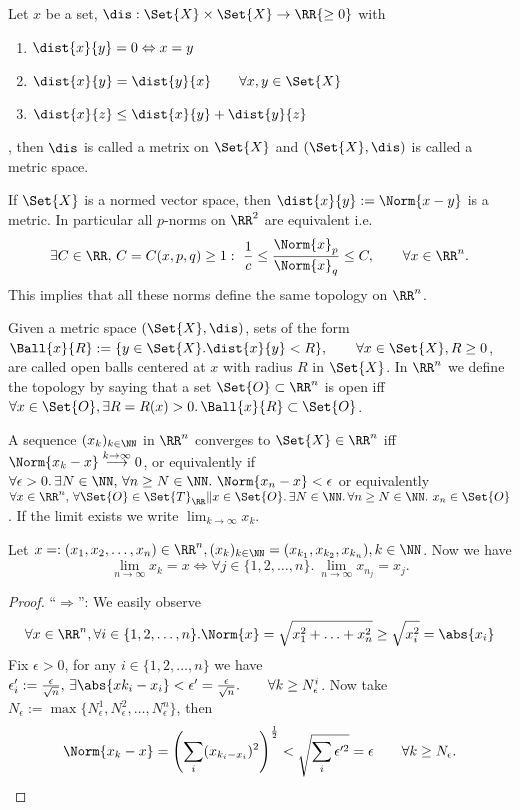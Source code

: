 \begin{defn}
 Let $x$ be a set, $\dis:\Set{X}\times\Set{X}\to\RR{\geq 0}$ with 
 \begin{enumerate}
  \item $\dist{x}{y}=0\Leftrightarrow x=y$
  \item $\dist{x}{y}=\dist{y}{x}\qquad\forall x,y\in\Set{X}$
  \item $\dist{x}{z}\leq \dist{x}{y}+\dist{y}{z}$
 \end{enumerate}, then $\dis$ is called a metrix on $\Set{X}$ and $(\Set{X}, \dis)$ is called a metric space. 
\end{defn}
\begin{exc}
 If $\Set{X}$ is a normed vector space, then $\dist{x}{y}:=\Norm{x-y}$ is a metric. 
 In particular all $p$-norms on $\RR^2$ are equivalent i.e.
 $$\exists C\in\RR,\,C=C(x,p,q)\geq 1:\ \frac{1}{c}\leq\frac{\Norm{x}_p}{\Norm{x}_q}\leq C, \qquad\forall x\in\RR^n.$$
 This implies that all these norms define the same topology on $\RR^n$. 
\end{exc}
\begin{rem}
 Given a metric space $(\Set{X}, \dis)$, sets of the form $\Ball{x}{R}:=\{y\in\Set{X}.\dist{x}{y}<R\}, \qquad\forall x\in\Set{X}, R\geq 0$, are called open balls centered at $x$ with radius $R$ in $\Set{X}$. In $\RR^n$ we define the topology by saying that a set $\Set{O}\subset\RR^n$ is open iff $\forall x\in\Set{O}, \exists R=R(x)>0. \,\Ball{x}{R}\subset\Set{O}$.
\end{rem}
\begin{defn}
 A sequence $(x_k)_{k\in\NN}$ in $\RR^n$ converges to $\Set{X}\in\RR^n$ iff $\Norm{x_k-x}\overset{k\to\infty}{\longrightarrow}0$, or equivalently if $\forall \epsilon>0.\,\exists N\in\NN, \,\forall n\geq N\in\NN.\ \Norm{x_n-x}<\epsilon$ or equivalently $\forall x\in\RR^n,\,\forall \Set{O}\in\Set{T}_{\RR}\|x\in\Set{O}.\,\exists N\in\NN.\,\forall n\geq N\in\NN.\ x_n\in\Set{O}$. If the limit exists we write $\lim_{k\to\infty}x_k$.
\end{defn}
\begin{lem}
 \label{lem:comp}
 Let $x=:(x_1, x_2,\ldots,x_n)\in\RR^n, (x_k)_{k\in\NN}=(x_{k_1},x_{k_2}, x_{k_n}), k\in\NN$.
 Now we have $$\lim_{n\to\infty}x_k=x\Leftrightarrow \forall j\in \{1,2,\ldots,n\}.\ \lim_{n\to\infty}x_{n_j}=x_j.$$
\end{lem}
\begin{proof}
 ``$\Rightarrow$'': We easily observe $$\forall x\in\RR^n, \forall i\in\{1, 2, \ldots,n\}. \Norm{x}=\sqrt{x_1^2+\ldots+x_n^2}\geq \sqrt{x_i ^2}=\abs{x_i}$$
 Fix $\epsilon>0$, for any $i\in\{1, 2, \ldots, n\}$ we have $\epsilon_i':=\frac{\epsilon}{\sqrt{n}},\,\exists\abs{x{k_i}-x_i}<\epsilon'=\frac{\epsilon}{\sqrt{n}}.\qquad\forall k\geq N_{\epsilon}^i$. Now take $N_\epsilon:=\max\{N_{\epsilon}^1, N_{\epsilon}^2, \ldots, N_{\epsilon}^n\}$, then $$\Norm{x_k-x}=\left(\sum_i(x_{k_i-x_i})^2\right)^{\frac{1}{2}}<\sqrt{\sum_i \epsilon'^2}=\epsilon\qquad\forall k\geq N_\epsilon.$$
\end{proof}

